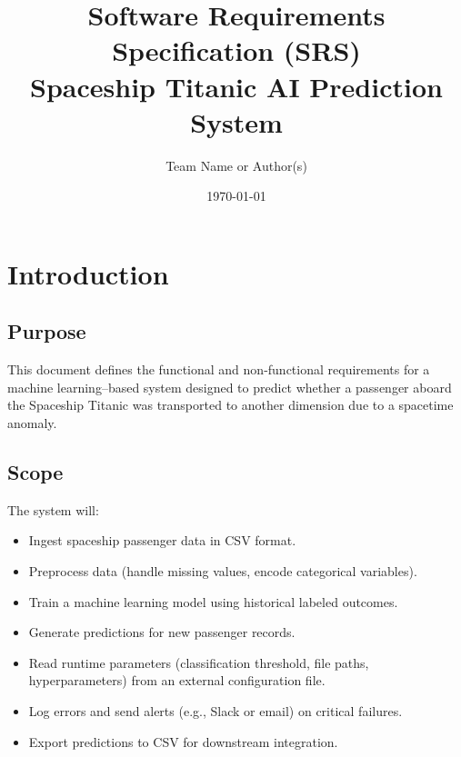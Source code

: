 \documentclass[15pt]{article}
\title{Software Requirements Specification (SRS)\\\large Spaceship Titanic AI Prediction System}
\author{Team Name or Author(s)}
\date{\today}
\begin{document}
\maketitle
\tableofcontents
\newpage

\section{Introduction}
\subsection{Purpose}
This document defines the functional and non-functional requirements for a machine learning–based system designed to predict whether a passenger aboard the Spaceship Titanic was transported to another dimension due to a spacetime anomaly.

\subsection{Scope}
The system will:
\begin{itemize}
  \item Ingest spaceship passenger data in CSV format.
  \item Preprocess data (handle missing values, encode categorical variables).
  \item Train a machine learning model using historical labeled outcomes.
  \item Generate predictions for new passenger records.
  \item Read runtime parameters (classification threshold, file paths, hyperparameters) from an external configuration file.
  \item Log errors and send alerts (e.g., Slack or email) on critical failures.
  \item Export predictions to CSV for downstream integration.
\end{itemize}
\end{document}
